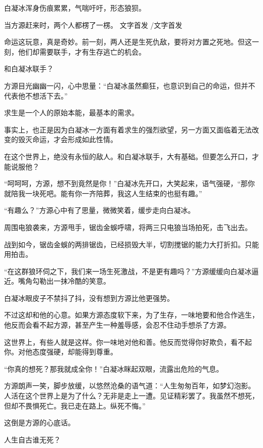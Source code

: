 
\begin{this_body}

白凝冰浑身伤痕累累，气喘吁吁，形态狼狈。

当方源赶来时，两个人都楞了一楞。 文字首发 /文字首发

命运这玩意，真是奇妙。前一刻，两人还是生死仇敌，要将对方置之死地。但这一刻，他们却需要联手，才有生存逃亡的机会。

和白凝冰联手？

方源目光幽幽一闪，心中思量：“白凝冰虽然癫狂，也意识到自己的命运，但并不代表他不想活下去。”

求生是一个人的原始本能，最基本的需求。

事实上，也正是因为白凝冰一方面有着求生的强烈欲望，另一方面又面临着无法改变的毁灭命运，才会形成如此性情。

在这个世界上，绝没有永恒的敌人。和白凝冰联手，大有基础。但要怎么开口，才能说服他？

“呵呵呵，方源，想不到竟然是你！”白凝冰先开口，大笑起来，语气强硬，“那你就陪我一块死吧。能有你一齐陪葬，我这人生结束的也挺有趣。”

“有趣么？”方源心中有了思量，微微笑着，缓步走向白凝冰。

周围电狼袭来，方源甩手，锯齿金蜈呼啸，将两三只电狼当场拍死，击飞出去。

战到如今，锯齿金蜈的两排锯齿，已经损毁大半，切割搅锯的能力大打折扣。只能用拍击。

“在这群狼环伺之下，我们来一场生死激战，不是更有趣吗？”方源缓缓向白凝冰逼近。嘴角勾勒出一抹冷酷的笑意。

白凝冰眼皮子不禁抖了抖，没有想到方源比他更强势。

不过这却和他的心意。如果方源态度软下来，为了生存，一味地要和他合作逃生，他反而会看不起方源，甚至产生一种羞辱感，会忍不住动手想杀了方源。

这世界上，有些人就是这样。你一味地对他和善。他反而觉得你好欺负，看不起你。对他态度强硬，却能得到尊重。

“你真的想死？那我就成全你！”白凝冰眯起双眼，流露出危险的气息。

方源朗声一笑，脚步放缓，以悠然沧桑的语气道：“人生匆匆百年，如梦幻泡影。人活在这个世界上是为了什么？无非是走上一遭。见证精彩罢了。我虽然不想死，但却不畏惧死亡。我已走在路上。纵死不悔。”

这倒是方源的心底话。

人生自古谁无死？


\end{this_body}
